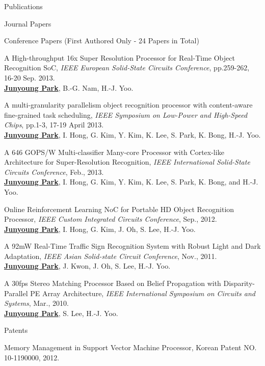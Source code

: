 \documentclass{resume} %
\begin{document}
\begin{section}{Publications}
\begin{subsection}{Journal Papers}{}{}{}
\end{subsection}

\begin{subsection}{Conference Papers (First Authored Only - 24 Papers in Total)}{}{}{}

\item A High-throughput 16x Super Resolution Processor for Real-Time Object Recognition SoC, \emph{IEEE European Solid-State Circuits Conference}, pp.259-262, 16-20 Sep. 2013. \\
\underline{\bf Junyoung Park}, B.-G. Nam, H.-J. Yoo.

\item A multi-granularity parallelism object recognition processor with content-aware fine-grained task scheduling, \emph{IEEE Symposium on Low-Power and High-Speed Chips}, pp.1-3, 17-19 April 2013. \\
\underline{\bf Junyoung Park}, I. Hong, G. Kim, Y. Kim, K. Lee, S. Park, K. Bong, H.-J. Yoo.

\item A 646 GOPS/W Multi-classifier Many-core Processor with Cortex-like Architecture for Super-Resolution Recognition, \emph{IEEE International Solid-State Circuits Conference}, Feb., 2013. \\
\underline{\bf Junyoung Park}, I. Hong, G. Kim, Y. Kim, K. Lee, S. Park, K. Bong, and H.-J. Yoo.

\item Online Reinforcement Learning NoC for Portable HD Object Recognition Processor, \emph{IEEE Custom Integrated Circuits Conference}, Sep., 2012. \\
\underline{\bf Junyoung Park}, I. Hong, G. Kim, J. Oh, S. Lee, H.-J. Yoo.

\item A 92mW Real-Time Traffic Sign Recognition System with Robust Light and Dark Adaptation, \emph{IEEE Asian Solid-state Circuit Conference}, Nov., 2011. \\
\underline{\bf Junyoung Park}, J. Kwon, J. Oh, S. Lee, H.-J. Yoo.

\item A 30fps Stereo Matching Processor Based on Belief Propagation with Disparity-Parallel PE Array Architecture, \emph{IEEE International Symposium on Circuits and Systems}, Mar., 2010. \\
\underline{\bf Junyoung Park}, S. Lee, H.-J. Yoo.

\end{subsection}

\begin{subsection}{Patents}{}{}{}
\item Memory Management in Support Vector Machine Processor, Korean Patent NO. 10-1190000, 2012.
\end{subsection}

\end{section}
\end{document}
